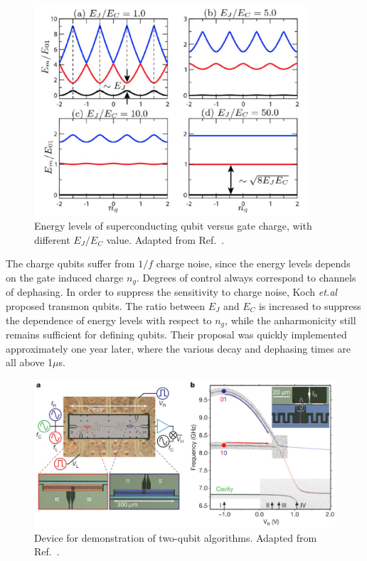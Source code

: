\documentclass[%
groupedaddress,
showpacs,
 amsmath,amssymb,
 aps,
prb,
]{revtex4-1}
\newcommand{\etal}{\textit{et.al}}
\begin{document}
            \begin{figure}[h]
                \centering
                \includegraphics[width=4in]{review/transmon2007.png}
                \caption{Energy levels of superconducting qubit versus gate charge, with different $E_J/E_C$ value. Adapted from Ref.~.}
                \label{fig:transmon2007}
            \end{figure}


The charge qubits suffer from $1/f$ charge noise, since the energy levels depends on the gate induced charge $n_g$. Degrees of control always correspond to channels of dephasing. In order to suppress the sensitivity to charge noise, Koch \etal{} proposed transmon qubits\cite{koch2007charge}. The ratio between $E_J$ and $E_C$ is increased to suppress the dependence of energy levels with respect to $n_g$, while the anharmonicity still remains sufficient for defining qubits. Their proposal was quickly implemented approximately one year later\cite{Schreier2008}, where the various decay and dephasing times are all above 1$\mu$s.


            \begin{figure}[h]
                \centering
                \includegraphics[width=5in]{review/twoQubit2009.png}
                \caption{Device for demonstration of two-qubit algorithms. Adapted from Ref.~.}
                \label{fig:twoQubit2009}
            \end{figure}
\end{document}
